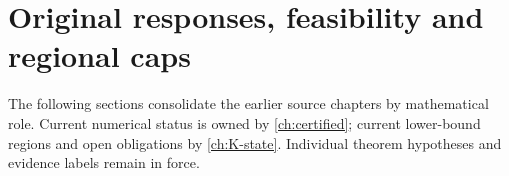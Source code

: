 \chapter{Original responses, feasibility and regional caps}\label{ch:06-original-responses}
\noindent The following sections consolidate the earlier source chapters by mathematical role. Current numerical status is owned by \autoref{ch:certified}; current lower-bound regions and open obligations by \autoref{ch:K-state}. Individual theorem hypotheses and evidence labels remain in force.






